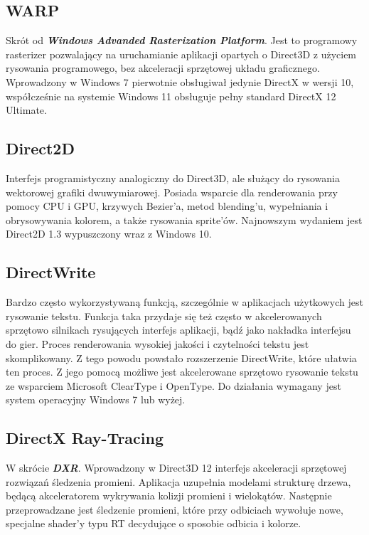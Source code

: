 \subsection{WARP}
Skrót od \emph{\textbf{Windows Advanded Rasterization Platform}}. Jest
to programowy rasterizer pozwalający na uruchamianie aplikacji opartych
o Direct3D z użyciem rysowania programowego, bez akceleracji sprzętowej
układu graficznego. Wprowadzony w Windows 7 pierwotnie obsługiwał jedynie DirectX w wersji
10, współcześnie na systemie Windows 11 obsługuje pełny standard DirectX
12 Ultimate.

\subsection{Direct2D}
Interfejs programistyczny analogiczny do Direct3D, ale służący do
rysowania wektorowej grafiki dwuwymiarowej. Posiada wsparcie dla
renderowania przy pomocy CPU i GPU, krzywych Bezier'a, metod blending'u,
wypełniania i obrysowywania kolorem, a także rysowania sprite'ów. Najnowszym wydaniem jest Direct2D 1.3 wypuszczony wraz z Windows 10.

\subsection{DirectWrite}
Bardzo często wykorzystywaną funkcją, szczególnie w aplikacjach
użytkowych jest rysowanie tekstu. Funkcja taka przydaje się też często w
akcelerowanych sprzętowo silnikach rysujących interfejs aplikacji, bądź
jako nakładka interfejsu do gier. Proces renderowania wysokiej jakości i czytelności tekstu jest
skomplikowany. Z tego powodu powstało rozszerzenie DirectWrite, które
ułatwia ten proces. Z jego pomocą możliwe jest akcelerowane sprzętowo
rysowanie tekstu ze wsparciem Microsoft ClearType i OpenType. Do
działania wymagany jest system operacyjny Windows 7 lub wyżej.

\subsection{DirectX Ray-Tracing}
W skrócie \emph{\textbf{DXR}}. Wprowadzony w Direct3D 12 interfejs
akceleracji sprzętowej rozwiązań śledzenia promieni. Aplikacja uzupełnia
modelami strukturę drzewa, będącą akceleratorem
wykrywania kolizji promieni i wielokątów. Następnie przeprowadzane jest
śledzenie promieni, które przy odbiciach wywołuje nowe, specjalne
shader'y typu RT decydujące o sposobie odbicia i kolorze.

